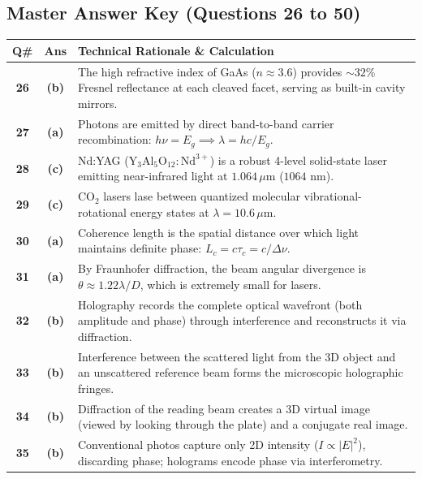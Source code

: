 \newpage

\subsection*{Master Answer Key (Questions 26 to 50)}

{\small
\noindent\begin{tabularx}{\textwidth}{|c|c|X|}
\hline
\textbf{Q\#} & \textbf{Ans} & \textbf{Technical Rationale \& Calculation} \\
\hline
\textbf{26} & \textbf{(b)} & The high refractive index of GaAs ($n \approx 3.6$) provides $\sim 32\%$ Fresnel reflectance at each cleaved facet, serving as built-in cavity mirrors. \\ \hline
\textbf{27} & \textbf{(a)} & Photons are emitted by direct band-to-band carrier recombination: $h\nu = E_g \implies \lambda = hc/E_g$. \\ \hline
\textbf{28} & \textbf{(c)} & Nd:YAG ($\text{Y}_3\text{Al}_5\text{O}_{12}:\text{Nd}^{3+}$) is a robust 4-level solid-state laser emitting near-infrared light at $1.064\,\mu\text{m}$ ($1064\text{ nm}$). \\ \hline
\textbf{29} & \textbf{(c)} & $\text{CO}_2$ lasers lase between quantized molecular vibrational-rotational energy states at $\lambda = 10.6\,\mu\text{m}$. \\ \hline
\textbf{30} & \textbf{(a)} & Coherence length is the spatial distance over which light maintains definite phase: $L_c = c\tau_c = c/\Delta\nu$. \\ \hline
\textbf{31} & \textbf{(a)} & By Fraunhofer diffraction, the beam angular divergence is $\theta \approx 1.22 \lambda / D$, which is extremely small for lasers. \\ \hline
\textbf{32} & \textbf{(b)} & Holography records the complete optical wavefront (both amplitude and phase) through interference and reconstructs it via diffraction. \\ \hline
\textbf{33} & \textbf{(b)} & Interference between the scattered light from the 3D object and an unscattered reference beam forms the microscopic holographic fringes. \\ \hline
\textbf{34} & \textbf{(b)} & Diffraction of the reading beam creates a 3D virtual image (viewed by looking through the plate) and a conjugate real image. \\ \hline
\textbf{35} & \textbf{(b)} & Conventional photos capture only 2D intensity ($I \propto |E|^2$), discarding phase; holograms encode phase via interferometry. \\ \hline

\end{tabularx}}
